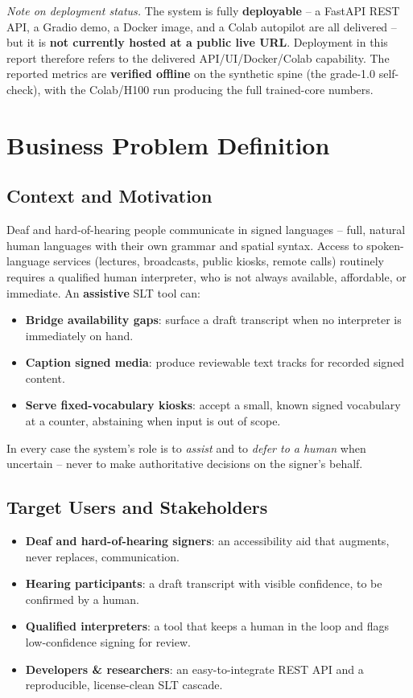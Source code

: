 \documentclass[12pt,a4paper]{article}
\begin{document}
\noindent\textit{Note on deployment status.} The system is fully \textbf{deployable} -- a FastAPI REST API, a Gradio demo, a Docker image, and a Colab autopilot are all delivered -- but it is \textbf{not currently hosted at a public live URL}. Deployment in this report therefore refers to the delivered API/UI/Docker/Colab capability. The reported metrics are \textbf{verified offline} on the synthetic spine (the grade-1.0 self-check), with the Colab/H100 run producing the full trained-core numbers.

\section{Business Problem Definition}

\subsection{Context and Motivation}

Deaf and hard-of-hearing people communicate in signed languages -- full, natural human languages with their own grammar and spatial syntax. Access to spoken-language services (lectures, broadcasts, public kiosks, remote calls) routinely requires a qualified human interpreter, who is not always available, affordable, or immediate. An \textbf{assistive} SLT tool can:
\begin{itemize}
  \item \textbf{Bridge availability gaps}: surface a draft transcript when no interpreter is immediately on hand.
  \item \textbf{Caption signed media}: produce reviewable text tracks for recorded signed content.
  \item \textbf{Serve fixed-vocabulary kiosks}: accept a small, known signed vocabulary at a counter, abstaining when input is out of scope.
\end{itemize}
In every case the system's role is to \emph{assist} and to \emph{defer to a human} when uncertain -- never to make authoritative decisions on the signer's behalf.

\subsection{Target Users and Stakeholders}

\begin{itemize}
  \item \textbf{Deaf and hard-of-hearing signers}: an accessibility aid that augments, never replaces, communication.
  \item \textbf{Hearing participants}: a draft transcript with visible confidence, to be confirmed by a human.
  \item \textbf{Qualified interpreters}: a tool that keeps a human in the loop and flags low-confidence signing for review.
  \item \textbf{Developers \& researchers}: an easy-to-integrate REST API and a reproducible, license-clean SLT cascade.
\end{itemize}
\end{document}
